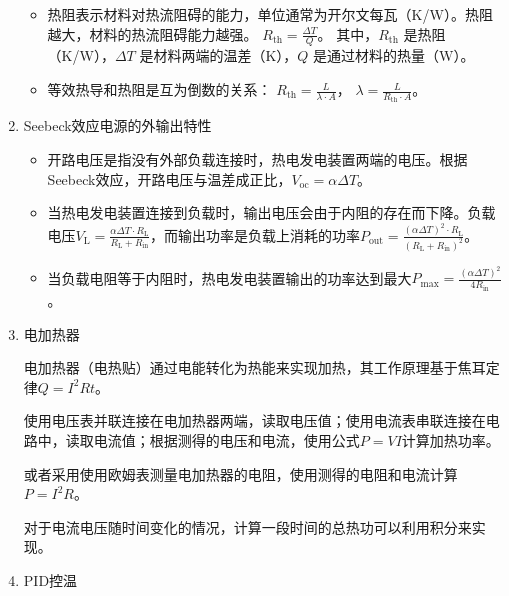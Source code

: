 \documentclass[dvipsnames, svgnames,a4paper,11pt]{article}
\begin{document}
\begin{enumerate}
\begin{itemize}
			\item 热阻表示材料对热流阻碍的能力，单位通常为开尔文每瓦（K/W）。热阻越大，材料的热流阻碍能力越强。
			$
			R_{\text{th}} = \frac{\Delta T}{Q}
			$。
			其中，$R_{\text{th}}$ 是热阻（K/W），$\Delta T$ 是材料两端的温差（K），$Q$ 是通过材料的热量（W）。
			
			\item 等效热导和热阻是互为倒数的关系：
			$
			R_{\text{th}} = \frac{L}{\lambda \cdot A}
			$，
			$
			\lambda = \frac{L}{R_{\text{th}} \cdot A}
			$。
		\end{itemize}
		
		\item Seebeck效应电源的外输出特性
		
		\begin{itemize}
			\item 开路电压是指没有外部负载连接时，热电发电装置两端的电压。根据Seebeck效应，开路电压与温差成正比，$V_{\text{oc}} = \alpha \Delta T$。
			
			\item 当热电发电装置连接到负载时，输出电压会由于内阻的存在而下降。负载电压$V_{\text{L}} = \frac{\alpha \Delta T \cdot R_{\text{L}}}{R_{\text{L}} + R_{\text{in}}}$，而输出功率是负载上消耗的功率$P_{\text{out}} = \frac{(\alpha \Delta T)^2 \cdot R_{\text{L}}}{(R_{\text{L}} + R_{\text{in}})^2}$。
			
			\item 当负载电阻等于内阻时，热电发电装置输出的功率达到最大$P_{\text{max}} = \frac{(\alpha \Delta T)^2}{4 R_{\text{in}}}$。				
		\end{itemize}
		
		\item 电加热器
		
		电加热器（电热贴）通过电能转化为热能来实现加热，其工作原理基于焦耳定律$Q = I^2 R t$。
		
		使用电压表并联连接在电加热器两端，读取电压值；使用电流表串联连接在电路中，读取电流值；根据测得的电压和电流，使用公式$P = VI$计算加热功率。
		
		或者采用使用欧姆表测量电加热器的电阻，使用测得的电阻和电流计算$P = I^2 R$。
		
		对于电流电压随时间变化的情况，计算一段时间的总热功可以利用积分来实现。
		
		\clearpage
		\item PID控温
		

\end{enumerate}
\end{document}
